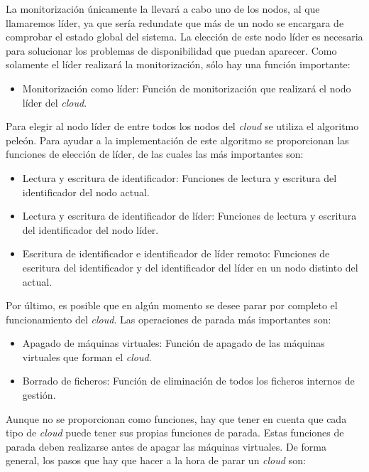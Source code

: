 La monitorización únicamente la llevará a cabo uno de los nodos, al que llamaremos líder, ya que sería redundate que más de un nodo se encargara de comprobar el estado global del sistema. La elección de este nodo líder es necesaria para solucionar los problemas de disponibilidad que puedan aparecer. Como solamente el líder realizará la monitorización, sólo hay una función importante:

\begin{itemize}
\item Monitorización como líder: Función de monitorización que realizará el nodo líder del \emph{cloud}.
\end{itemize}

Para elegir al nodo líder de entre todos los nodos del \emph{cloud} se utiliza el algoritmo peleón. Para ayudar a la implementación de este algoritmo se proporcionan las funciones de elección de líder, de las cuales las más importantes son:

\begin{itemize}
\item Lectura y escritura de identificador: Funciones de lectura y escritura del identificador del nodo actual.
\item Lectura y escritura de identificador de líder: Funciones de lectura y escritura del identificador del nodo líder.
\item Escritura de identificador e identificador de líder remoto: Funciones de escritura del identificador y del identificador del líder en un nodo distinto del actual.
\end{itemize}

Por último, es posible que en algún momento se desee parar por completo el funcionamiento del \emph{cloud}. Las operaciones de parada más importantes son:

\begin{itemize}
\item Apagado de máquinas virtuales: Función de apagado de las máquinas virtuales que forman el \emph{cloud}.
\item Borrado de ficheros: Función de eliminación de todos los ficheros internos de gestión.
\end{itemize}

Aunque no se proporcionan como funciones, hay que tener en cuenta que cada tipo de \emph{cloud} puede tener sus propias funciones de parada. Estas funciones de parada deben realizarse antes de apagar las máquinas virtuales. De forma general, los pasos que hay que hacer a la hora de parar un \emph{cloud} son:

